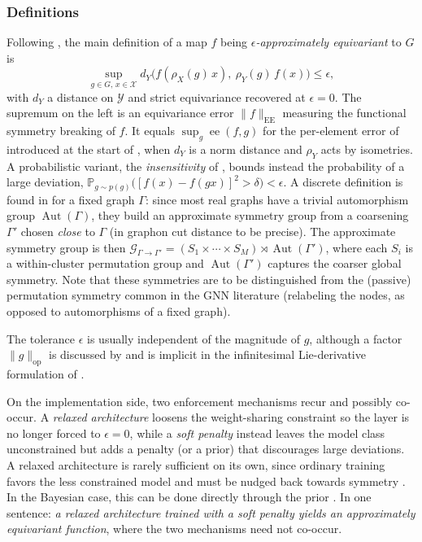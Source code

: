 \documentclass[mathematics,review,submit,moreauthors]{Definitions/mdpi}
\begin{document}
\subsubsection{Definitions}\label{sec:approx-definitions}
Following \citep{wang2022p3icml,sipiran202523scgpis,ali2026}, the main definition of a map $f$ being \emph{$\epsilon$-approximately equivariant} to $G$ is
\begin{equation}\label{eq:equiv-error-approximate}
    \sup_{g\in G,\,x\in \mathcal{X}} d_Y\big(f(\rho_X(g)\,x),\ \rho_Y(g)\,f(x)\big)\le \epsilon,
\end{equation}
with $d_Y$ a distance on $\mathcal{Y}$ and strict equivariance recovered at $\epsilon=0$.
The supremum on the left is an equivariance error $\|f\|_{\mathrm{EE}}$ measuring the functional symmetry breaking of $f$.
It equals $\sup_{g}\operatorname{ee}(f,g)$ for the per-element error of \citet{petrache2023} introduced at the start of , when $d_Y$ is a norm distance and $\rho_Y$ acts by isometries.
A probabilistic variant, the \emph{insensitivity} of \citet{vanderwilk2018anips}, bounds instead the probability of a large deviation, $\mathbb{P}_{g\sim p(g)}\big([f(x)-f(gx)]^2>\delta\big)<\epsilon$.
A discrete definition is found in \citet{huang2023} for a fixed graph $\Gamma$: since most real graphs have a trivial automorphism group $\operatorname{Aut}(\Gamma)$, they build an approximate symmetry group from a coarsening $\Gamma'$ chosen \textit{close} to $\Gamma$ (in graphon cut distance to be precise).
The approximate symmetry group is then $\mathcal{G}_{\Gamma\to\Gamma'}=(S_1\times\cdots\times S_M)\rtimes\operatorname{Aut}(\Gamma')$, where each $S_i$ is a within-cluster permutation group and $\operatorname{Aut}(\Gamma')$ captures the coarser global symmetry.
Note that these symmetries are to be distinguished from the (passive) permutation symmetry common in the GNN literature (relabeling the nodes, as opposed to automorphisms of a fixed graph).

\begin{Remark}
    The tolerance $\epsilon$ is usually independent of the magnitude of $g$, although a factor $\|g\|_{\mathrm{op}}$ is discussed by \citet{wang2022p3icml} and is implicit in the infinitesimal Lie-derivative formulation of \citet{pertigkiozoglou2024}.
\end{Remark}

On the implementation side, two enforcement mechanisms recur and possibly co-occur.
A \emph{relaxed architecture} loosens the weight-sharing constraint so the layer is no longer forced to $\epsilon=0$, while a \emph{soft penalty} instead leaves the model class unconstrained but adds a penalty (or a prior) that discourages large deviations.
A relaxed architecture is rarely sufficient on its own, since ordinary training favors the less constrained model and must be nudged back towards symmetry \citep{ouderaa2022,wang2022p3icml}.
In the Bayesian case, this can be done directly through the prior \citep{vanderwilk2018anips,ouderaa2023}.
In one sentence: \emph{a relaxed architecture trained with a soft penalty yields an approximately equivariant function}, where the two mechanisms need not co-occur.
\end{document}
